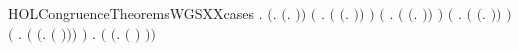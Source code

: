 \begin{SaveVerbatim}{HOLCongruenceTheoremsWGSXXcases}
\HOLTokenTurnstile{} \HOLSymConst{\HOLTokenForall{}}.
         \HOLSymConst{\HOLTokenEquiv{}}
       \ensuremath{(}\HOLSymConst{\HOLTokenExists{}}.  \HOLSymConst{\ensuremath{=}} \ensuremath{(}\HOLTokenLambda{}. \ensuremath{)}\ensuremath{)} \HOLSymConst{\HOLTokenDisj{}}
       \ensuremath{(}\HOLSymConst{\HOLTokenExists{}} . \ensuremath{(} \HOLSymConst{\ensuremath{=}} \ensuremath{(}\HOLTokenLambda{}. \HOLSymConst{\ensuremath{\ldotp}} \ensuremath{)}\ensuremath{)} \HOLSymConst{\HOLTokenConj{}}  \ensuremath{)} \HOLSymConst{\HOLTokenDisj{}}
       \ensuremath{(}\HOLSymConst{\HOLTokenExists{}}   .
            \ensuremath{(} \HOLSymConst{\ensuremath{=}} \ensuremath{(}\HOLTokenLambda{}. \HOLSymConst{\ensuremath{\ldotp}}  \HOLSymConst{\ensuremath{+}} \HOLSymConst{\ensuremath{\ldotp}} \ensuremath{)}\ensuremath{)} \HOLSymConst{\HOLTokenConj{}}   \HOLSymConst{\HOLTokenConj{}}
             \ensuremath{)} \HOLSymConst{\HOLTokenDisj{}}
       \ensuremath{(}\HOLSymConst{\HOLTokenExists{}} . \ensuremath{(} \HOLSymConst{\ensuremath{=}} \ensuremath{(}\HOLTokenLambda{}.   \HOLSymConst{\ensuremath{\mid}}  \ensuremath{)}\ensuremath{)} \HOLSymConst{\HOLTokenConj{}}   \HOLSymConst{\HOLTokenConj{}}  \ensuremath{)} \HOLSymConst{\HOLTokenDisj{}}
       \ensuremath{(}\HOLSymConst{\HOLTokenExists{}} . \ensuremath{(} \HOLSymConst{\ensuremath{=}} \ensuremath{(}\HOLTokenLambda{}.   \ensuremath{(} \ensuremath{)}\ensuremath{)}\ensuremath{)} \HOLSymConst{\HOLTokenConj{}}  \ensuremath{)} \HOLSymConst{\HOLTokenDisj{}}
       \HOLSymConst{\HOLTokenExists{}} . \ensuremath{(} \HOLSymConst{\ensuremath{=}} \ensuremath{(}\HOLTokenLambda{}.  \ensuremath{(} \ensuremath{)} \ensuremath{)}\ensuremath{)} \HOLSymConst{\HOLTokenConj{}}  
\end{SaveVerbatim}
